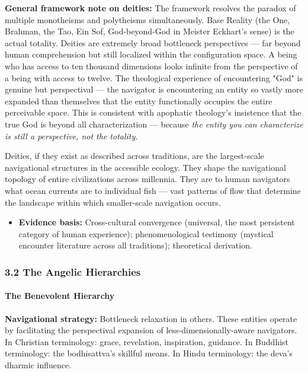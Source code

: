 \textbf{General framework note on deities:} The framework resolves the paradox of multiple monotheisms and polytheisms simultaneously. Base Reality (the One, Brahman, the Tao, Ein Sof, God-beyond-God in Meister Eckhart's sense) is the actual totality. Deities are extremely broad bottleneck perspectives — far beyond human comprehension but still localized within the configuration space. A being who has access to ten thousand dimensions looks infinite from the perspective of a being with access to twelve. The theological experience of encountering "God" is genuine but perspectival — the navigator is encountering an entity so vastly more expanded than themselves that the entity functionally occupies the entire perceivable space. This is consistent with apophatic theology's insistence that the true God is beyond all characterization — because \textit{the entity you can characterize is still a perspective, not the totality.}


Deities, if they exist as described across traditions, are the largest-scale navigational structures in the accessible ecology. They shape the navigational topology of entire civilizations across millennia. They are to human navigators what ocean currents are to individual fish — vast patterns of flow that determine the landscape within which smaller-scale navigation occurs.

\begin{itemize}[nosep,leftmargin=*]
  \item \textbf{Evidence basis:} Cross-cultural convergence (universal, the most persistent category of human experience); phenomenological testimony (mystical encounter literature across all traditions); theoretical derivation.
\end{itemize}


\subsubsection*{3.2 The Angelic Hierarchies}


\paragraph*{The Benevolent Hierarchy}


\textbf{Navigational strategy:} Bottleneck relaxation in others. These entities operate by facilitating the perspectival expansion of less-dimensionally-aware navigators. In Christian terminology: grace, revelation, inspiration, guidance. In Buddhist terminology: the bodhisattva's skillful means. In Hindu terminology: the deva's dharmic influence.


